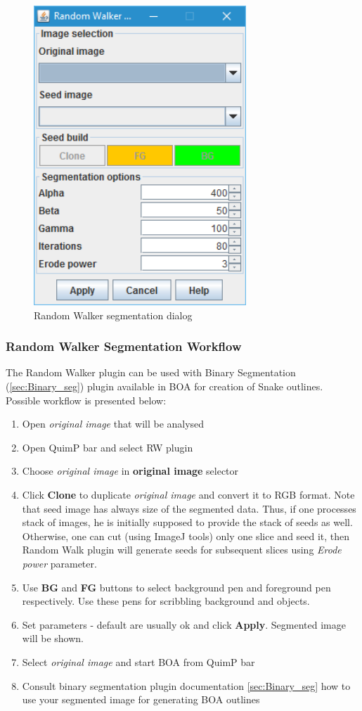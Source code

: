 \documentclass[a4paper,12pt]{article}
\begin{document}
\begin{figure}[ht]
	\centering
	\includegraphics[width=8cm]{screenRandomWalk.png} 
	\caption{Random Walker segmentation dialog}
	\label{fig:rwdialog}
\end{figure}

\subsubsection{Random Walker Segmentation Workflow}

The Random Walker plugin can be used with Binary Segmentation (\ref{sec:Binary_seg}) plugin available in BOA for creation of Snake outlines. Possible workflow is presented below:

\begin{enumerate}
	\item Open \textit{original image} that will be analysed
	\item Open QuimP bar and select RW plugin
	\item Choose \textit{original image} in \textbf{original image} selector
	\item Click \textbf{Clone} to duplicate \textit{original image} and convert it to RGB format. Note that seed image has always size of the segmented data. Thus, if one processes stack of images, he is initially supposed to provide the stack of seeds as well. Otherwise, one can cut (using ImageJ tools) only one slice and seed it, then Random Walk plugin will generate seeds for subsequent slices using \textit{Erode power} parameter.  
	\item Use \textbf{BG} and \textbf{FG} buttons to select background pen and foreground pen respectively. Use these pens for scribbling background and objects.
	\item Set parameters - default are usually ok and click \textbf{Apply}. Segmented image will be shown.
	\item Select \textit{original image} and start BOA from QuimP bar
	\item Consult binary segmentation plugin documentation \ref{sec:Binary_seg} how to use your segmented image for generating BOA outlines   
\end{enumerate}
\end{document}
